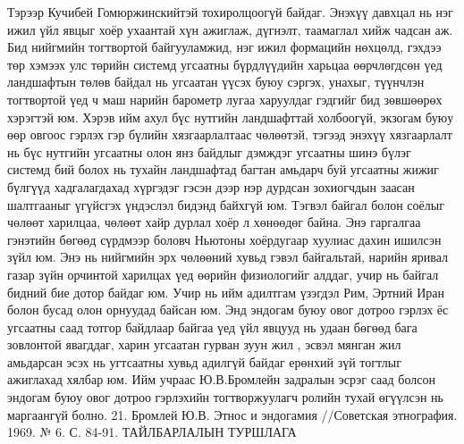 Тэрээр Кучибей Гомюржинскийтэй тохиролцоогүй байдаг. Энэхүү давхцал нь нэг ижил үйл явцыг хоёр ухаантай хүн ажиглаж, дүгнэлт, таамаглал хийж чадсан аж. Бид нийгмийн тогтвортой байгууламжид, нэг ижил формацийн нөхцөлд, гэхдээ төр хэмээх улс төрийн системд угсаатны бүрдлүүдийн харьцаа өөрчлөгдсөн үед ландшафтын төлөв байдал нь угсаатан үүсэх буюу сэргэх, унахыг, түүнчлэн тогтвортой үед ч маш нарийн барометр лугаа харуулдаг гэдгийг бид зөвшөөрөх хэрэгтэй юм.
Хэрэв ийм ахул бүс нутгийн ландшафттай холбоогүй, экзогам буюу өөр овгоос гэрлэх гэр бүлийн хязгаарлалтаас чөлөөтэй, тэгээд энэхүү хязгаарлалт нь бүс нутгийн угсаатны олон янз байдлыг дэмждэг угсаатны шинэ бүлэг системд бий болох нь тухайн ландшафтад багтан амьдарч буй угсаатны жижиг бүлгүүд хадгалагдахад хүргэдэг гэсэн дээр нэр дурдсан зохиогчдын заасан шалтгааныг үгүйсгэх үндэслэл бидэнд байхгүй юм. Тэгвэл байгал болон соёлыг чөлөөт харилцаа, чөлөөт хайр дурлал хоёр л хөнөөдөг байна.
Энэ гаргалгаа гэнэтийн бөгөөд сүрдмээр боловч Ньютоны хоёрдугаар хуулиас дахин ишилсэн зүйл юм. Энэ нь нийгмийн эрх чөлөөний хувьд гэвэл байгальтай, нарийн яривал газар зүйн орчинтой харилцах үед өөрийн физиологийг алддаг, учир нь байгал бидний бие дотор байдаг юм.
Учир нь ийм адилтгам үзэгдэл Рим, Эртний Иран болон бусад олон орнуудад байсан юм. Энд эндогам буюу овог дотроо гэрлэх ёс угсаатны саад тотгор байдлаар байгаа үед үйл явцууд нь удаан бөгөөд бага зовлонтой явагддаг, харин угсаатан гурван зуун жил , эсвэл мянган жил амьдарсан эсэх нь угтсаатны хувьд адилгүй байдаг ерөнхий зүй тогтлыг ажиглахад хялбар юм. Ийм учраас Ю.В.Бромлейн задралын эсрэг саад болсон эндогам буюу овог дотроо гэрлэхийн тогтворжуулагч ролийн тухай өгүүлсэн нь маргаангүй болно. 21. Бромлей Ю.В. Этнос и эндогамия //Советская этнография. 1969. № 6. С. 84-91.
ТАЙЛБАРЛАЛЫН ТУРШЛАГА
